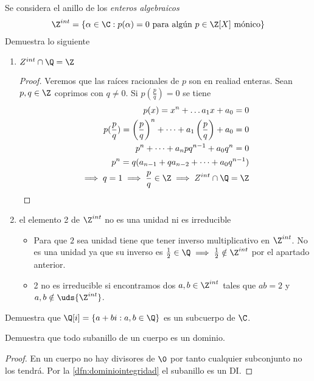 \begin{ex}[H5.9]
	Se considera el anillo de los \textit{enteros algebraicos}
	\begin{align*}
		\Z^{int} = \{\alpha \in \C : p(\alpha) = 0 \text{ para algún } p \in \Z[X] \text{ mónico}\}
	\end{align*}
	Demuestra lo siguiente
	\begin{enumerate}
		\item $Z^{int} \cap \Q = \Z$
		\begin{proof}
			Veremos que las raíces racionales de $p$ son en realiad enteras. Sean $p, q \in \Z$ coprimos con $q \neq 0$. Si $p(\frac{p}{q}) = 0$ se tiene
			\begin{align*}
				p(x) = x^n + \dots a_1x + a_0 = 0 \\
				p(\frac{p}{q}) = \left(\frac{p}{q}\right)^n + \dots + a_1 \left(\frac{p}{q}\right) + a_0 = 0 \\
				p^n + \dots + a_n p q^{n-1} + a_0 q^n = 0 \\
				p^n = q(a_{n-1} + q a_{n-2} + \dots + a_0 q^{n-1}) \\
				\implies q = 1 \implies \frac{p}{q} \in \Z \implies Z^{int} \cap \Q = \Z
			\end{align*}
		\end{proof}
		\item el elemento 2 de $\Z^{int}$ no es una unidad ni es irreducible
		\begin{itemize}
			\item Para que $2$ sea unidad tiene que tener inverso multiplicativo en $\Z^{int}$. No es una unidad ya que su inverso es $\frac{1}{2} \in \Q \implies \frac{1}{2}\notin \Z^{int}$ por el apartado anterior.
			\item 2 no es irreducible si encontramos dos $a,b \in \Z^{int}$ tales que $ab = 2$ y $a,b \notin \uds{\Z^{int}}$. %
		\end{itemize}
	\end{enumerate}
\end{ex}

\begin{ex}[H5.10]
	Demuestra que $\Q[i] = \{a+bi:a,b\in \Q\}$ es un subcuerpo de $\C$.
\end{ex}


\begin{ex}[H5.13]
	Demuestra que todo subanillo de un cuerpo es un dominio.
\end{ex}

\begin{proof}
	En un cuerpo no hay divisores de $\0$ por tanto cualquier subconjunto no los tendrá. Por la \autoref{dfn:dominiointegridad} el subanillo es un DI.
\end{proof}

